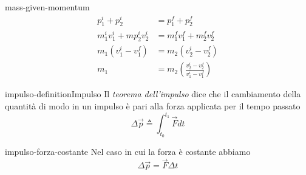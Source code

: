 \documentclass[preview]{standalone}
\begin{document}

\begin{snippet}{mass-given-momentum}
    \begin{align*}
        p_1^i + p_2^i &= p_1^f + p_2^f \\
        m_1^i v_1^i + mp_2^i  v_2^i &= m_1^f v_1^f + m_2^f v_2^f \\
        m_1 (v_1^i - v_1^f) &= m_2 (v_2^i - v_2^f) \\
        m_1 &= m_2 \left(
            \frac{v_2^i - v_2^f}{v_1^i - v_1^f}
        \right)
    \end{align*}
\end{snippet}

\begin{snippetdefinition}{impulso-definition}{Impulso}
    Il \textit{teorema dell'impulso}
    dice che il cambiamento della quantità di modo in un impulso
    è pari alla forza applicata per il tempo passato
    \[
        \Delta \vec{p} \triangleq \int_{t_0}^{t_1} \vec{F} dt    
    \]
\end{snippetdefinition}

\begin{snippet}{impulso-forza-costante}
    Nel caso in cui la forza è costante abbiamo
    \[
        \Delta \vec{p} = \vec{F}\Delta t
    \]
\end{snippet}

\end{document}
